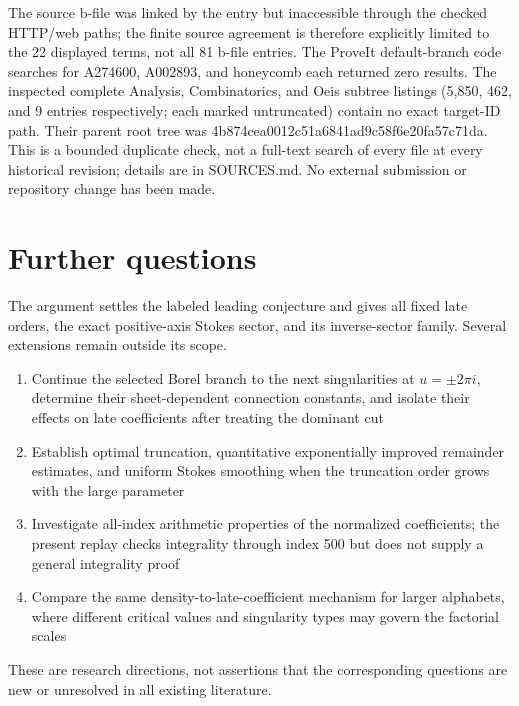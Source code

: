 \documentclass[11pt,letterpaper]{article}
\providecommand{\tightlist}{\setlength{\itemsep}{0pt}\setlength{\parskip}{0pt}}
\theoremstyle{remark}
\begin{document}
The source b-file was linked by the entry but inaccessible through the
checked HTTP/web paths; the finite source agreement is therefore
explicitly limited to the 22 displayed terms, not all 81 b-file entries.
The ProveIt default-branch code searches for A274600, A002893,
and honeycomb each returned zero results. The inspected complete
Analysis, Combinatorics, and Oeis subtree listings (5,850, 462, and 9
entries respectively; each marked untruncated) contain no exact
target-ID path. Their parent root tree was
4b874cea0012c51a6841ad9c58f6e20fa57c71da. This is a bounded duplicate
check, not a full-text search of every file at every historical
revision; details are in SOURCES.md. No external submission or
repository change has been made.

\section{Further questions}\label{further-questions}

The argument settles the labeled leading conjecture and gives all fixed
late orders, the exact positive-axis Stokes sector, and its
inverse-sector family. Several extensions remain outside its scope.

\begin{enumerate}
\def\labelenumi{\arabic{enumi}.}
\tightlist
\item
  Continue the selected Borel branch to the next singularities at
  \(u=\pm2\pi i\), determine their sheet-dependent connection constants,
  and isolate their effects on late coefficients after treating the
  dominant cut
\item
  Establish optimal truncation, quantitative exponentially improved
  remainder estimates, and uniform Stokes smoothing when the truncation
  order grows with the large parameter
\item
  Investigate all-index arithmetic properties of the normalized
  coefficients; the present replay checks integrality through index 500
  but does not supply a general integrality proof
\item
  Compare the same density-to-late-coefficient mechanism for larger
  alphabets, where different critical values and singularity types may
  govern the factorial scales
\end{enumerate}

These are research directions, not assertions that the corresponding
questions are new or unresolved in all existing literature.
\end{document}
